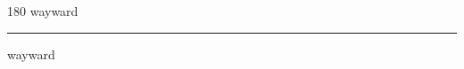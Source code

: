 
\begin{frame}
\begin{center}
\begin{turn}{180}
{\fontsize{2.5cm}{1em}\selectfont wayward}
\end{turn}
\vspace{1em}\par  
\hrule
\vspace{1em}\par  
{\fontsize{2.5cm}{1em}\selectfont wayward}
\end{center}
\end{frame}
